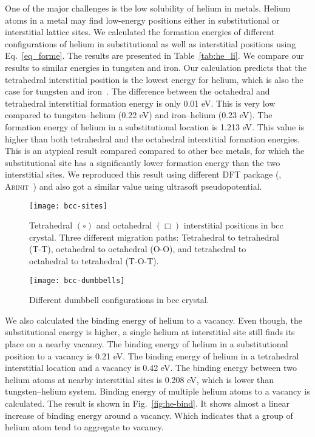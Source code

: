 One of the major challenges is the low solubility of helium in metals. Helium atoms in a metal may find low-energy positions either in substitutional or interstitial lattice sites. We calculated the formation energies of different configurations of helium in substitutional as well as interstitial positions using Eq.~\eqref{eq_forme}. The results are presented in Table~\ref{tab:he_li}. We compare our results to similar energies in tungsten and iron. Our calculation predicts that the tetrahedral interstitial position is the lowest energy for helium, which is also the case for tungsten and iron~\cite{becquart2007ab,fu2005}. The difference between the octahedral and tetrahedral interstitial formation energy is only 0.01 eV. This is very low compared to tungsten--helium (0.22 eV) and iron--helium (0.23 eV). The formation energy of helium in a substitutional location is 1.213 eV. This value is higher than both tetrahedral and the octahedral interstitial formation energies. This is an atypical result compared compared to other bcc metals, for which the substitutional site has a significantly lower formation energy than the two interstitial sites. We reproduced this result using different DFT package (\ie, \textsc{Abinit~\cite{gonze2016, gonze2020}}) and also got a similar value using  ultrasoft pseudopotential. 
\begin{figure}
\centering
\texttt{[image: bcc-sites]}
\caption{Tetrahedral $(\circ)$ and octahedral $(\Box)$ interstitial positions in bcc crystal. Three different migration paths: Tetrahedral to tetrahedral (T-T), octahedral to octahedral (O-O), and tetrahedral to octahedral to tetrahedral (T-O-T).}
\label{fig:dmbl}
\end{figure}

\begin{figure}
\centering
\texttt{[image: bcc-dumbbells]}
\caption{Different dumbbell configurations in bcc crystal.}
\label{fig:001}
\end{figure}

We also calculated the binding energy of helium to a vacancy. Even though, the substitutional energy is higher, a single helium at interstitial site still finds its place on a nearby vacancy. The binding energy of helium in a substitutional position to a vacancy is 0.21 eV. The binding energy of helium in a tetrahedral interstitial location and a vacancy is 0.42 eV. The binding energy between two helium atoms at nearby interstitial sites is 0.208 eV, which is lower than tungsten--helium system. Binding energy of multiple helium atoms to a vacancy is calculated. The result is shown in Fig.~\ref{fig:he-bind}. It shows almost a linear increase of binding energy around a vacancy. Which indicates that a group of helium atom tend to aggregate to vacancy. 

